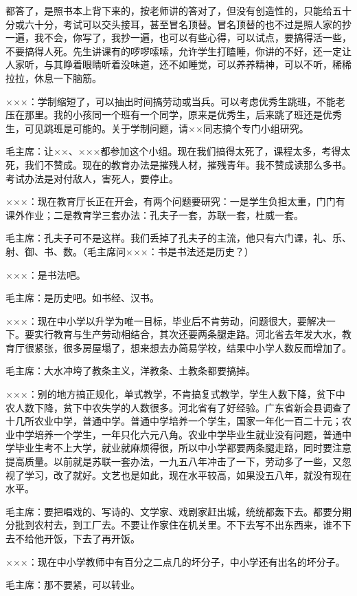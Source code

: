 都答了，是照书本上背下来的，按老师讲的答对了，但没有创造性的，只能给五十分或六十分，考试可以交头接耳，甚至冒名顶替。冒名顶替的也不过是照人家的抄一遍，我不会，你写了，我抄一遍，也可以有些心得，可以试点，要搞得活一些，不要搞得人死。先生讲课有的啰啰嗦嗦，允许学生打瞌睡，你讲的不好，还一定让人家听，与其睁着眼睛听着没味道，还不如睡觉，可以养养精神，可以不听，稀稀拉拉，休息一下脑筋。

×××：学制缩短了，可以抽出时间搞劳动或当兵。可以考虑优秀生跳班，不能老压在那里。我的小孩同一个班有一个同学，原来是优秀生，后来跳了班还是优秀生，可见跳班是可能的。关于学制问题，请××同志搞个专门小组研究。

毛主席：让××、×××都参加这个小组。现在我们搞得太死了，课程太多，考得太死，我们不赞成。现在的教育办法是摧残人材，摧残青年。我不赞成读那么多书。考试办法是对付敌人，害死人，要停止。

×××：现在教育厅长正在开会，有两个问题要研究：一是学生负担太重，门门有课外作业；二是教育学三套办法：孔夫子一套，苏联一套，杜威一套。

毛主席：孔夫子可不是这样。我们丢掉了孔夫子的主流，他只有六门课，礼、乐、射、御、书、数。（毛主席问×××：书是书法还是历史？）

×××：是书法吧。

毛主席：是历史吧。如书经、汉书。

×××：现在中小学以升学为唯一目标，毕业后不肯劳动，问题很大，要解决一下。要实行教育与生产劳动相结合，其次还要两条腿走路。河北省去年发大水，教育厅很紧张，很多房屋塌了，想来想去办简易学校，结果中小学人数反而增加了。

毛主席：大水冲垮了教条主义，洋教条、土教条都要搞掉。

×××：别的地方搞正规化，单式教学，不肯搞复式教学，学生人数下降，贫下中农人数下降，贫下中农失学的人数很多。河北省有了好经验。广东省新会县调查了十几所农业中学，普通中学。普通中学培养一个学生，国家一年化一百二十元；农业中学培养一个学生，一年只化六元八角。农业中学毕业生就业没有问题，普通中学毕业生考不上大学，就业就麻烦得很，所以中小学都要两条腿走路，同时要注意提高质量。以前就是苏联一套办法，一九五八年冲击了一下，劳动多了一些，又忽视了学习，改了就好。文艺也是如此，现在水平较高，如果没五八年，就没有现在水平。

毛主席：要把唱戏的、写诗的、文学家、戏剧家赶出城，统统都轰下去。都要分期分批到农村去，到工厂去。不要让作家住在机关里。不下去写不出东西来，谁不下去不给他开饭，下去了再开饭。

×××：现在中小学教师中有百分之二点几的坏分子，中小学还有出名的坏分子。

毛主席：那不要紧，可以转业。

